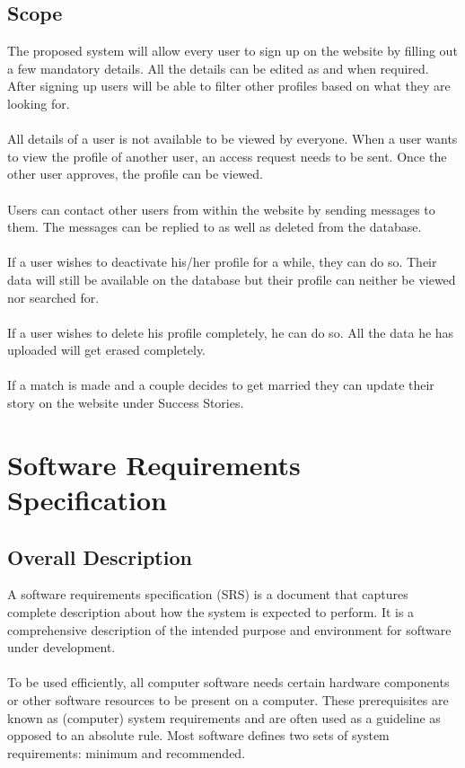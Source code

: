 \documentclass[12pt]{report}
\begin{document}
\section{Scope}
The proposed system will allow every user to sign up on the website by filling out a few mandatory details. All the details can be edited as and when required. After signing up users will be able to filter other profiles based on what they are looking for. \\\\
All details of a user is not available to be viewed by everyone. When a user wants to view the profile of another user, an access request needs to be sent. Once the other user approves, the profile can be viewed. \\\\
Users can contact other users from within the website by sending messages to them. The messages can be replied to as well as deleted from the database.\\\\
If a user wishes to deactivate his/her profile for a while, they can do so. Their data will still be available on the database but their profile can neither be viewed nor searched for. \\\\
If a user wishes to delete his profile completely, he can do so. All the data he has uploaded will get erased completely. \\\\
If a match is made and a couple decides to get married they can update their story on the website under Success Stories.   



\chapter{Software Requirements Specification}\label{ch:srr}

\section{Overall Description}
A software requirements specification (SRS) is a document that captures complete description      
about how the system is expected to perform. It is a comprehensive description of the intended purpose and environment for software under development.\\\\
To be used efficiently, all computer software needs certain hardware components or other software
resources to be present on a computer. These prerequisites are known as (computer) system
requirements and are often used as a guideline as opposed to an absolute rule. Most software defines
two sets of system requirements: minimum and recommended.
\end{document}

